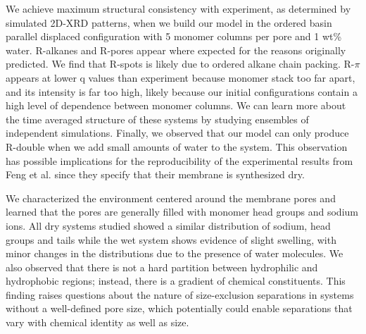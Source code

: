 \documentclass[journal=jpcbfk,manuscript=article]{achemso}
\begin{document}
  We achieve maximum structural consistency with experiment, as determined by
  simulated 2D-XRD patterns, when we build our model in the ordered basin
  parallel displaced configuration with 5 monomer columns per pore and 1 wt\%
  water. R-alkanes and R-pores appear where expected for the reasons originally
  predicted. We find that R-spots is likely due to ordered alkane chain packing.
  R-$\pi$ appears at lower q values than experiment because monomer stack too far
  apart, and its intensity is far too high, likely because our initial
  configurations contain a high level of dependence between monomer columns.
  We can learn more about the time averaged structure of these systems by studying
  ensembles of independent simulations. Finally, we observed that our model can 
  only produce R-double when we add small amounts of water to the system. This 
  observation has possible implications for the reproducibility of the experimental
  results from Feng et al. since they specify that their membrane is synthesized dry. 

  

  We characterized the environment centered around the membrane pores and
  learned that the pores are generally filled with monomer head groups and sodium
  ions. All dry systems studied showed a similar distribution of sodium, head
  groups and tails while the wet system shows evidence of slight swelling, with
  minor changes in the distributions due to the presence of water molecules. We
  also observed that there is not a hard partition between hydrophilic and
  hydrophobic regions; instead, there is a gradient of chemical constituents. This finding raises
  questions about the nature of size-exclusion separations in systems without a
  well-defined pore size, which potentially could enable separations that
  vary with chemical identity as well as size. 
\end{document}
